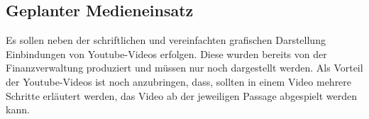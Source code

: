 \subsection{Geplanter Medieneinsatz}\label{Geplanter Medieneinsatz}
Es sollen neben der schriftlichen und vereinfachten grafischen Darstellung Einbindungen von Youtube-Videos erfolgen. Diese wurden bereits von der Finanzverwaltung produziert und müssen nur noch dargestellt werden. Als Vorteil der Youtube-Videos ist noch anzubringen, dass, sollten in einem Video mehrere Schritte erläutert werden, das Video ab der jeweiligen Passage abgespielt werden kann. 

